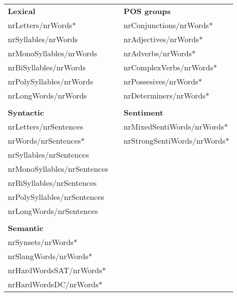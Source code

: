 \begin{tabular}{|l|l|l|} \cline{1-1}\cline{3-3}
\textbf{Lexical} & \textbf{} & \textbf{POS groups} \\ \cline{1-1}\cline{3-3}
nrLetters/nrWords* &  & nrConjunctions/nrWords* \\ \cline{1-1}\cline{3-3}
nrSyllables/nrWords &  & nrAdjectives/nrWords* \\ \cline{1-1}\cline{3-3}
nrMonoSyllables/nrWords &  & nrAdverbs/nrWords* \\ \cline{1-1}\cline{3-3}
nrBiSyllables/nrWords &  & nrComplexVerbs/nrWords* \\ \cline{1-1}\cline{3-3}
nrPolySyllables/nrWords &  & nrPossesives/nrWords* \\ \cline{1-1}\cline{3-3}
nrLongWords/nrWords &  & nrDeterminers/nrWords* \\ \cline{1-1}\cline{3-3}
\multicolumn{3}{c}{} \\ \cline{1-1}\cline{3-3}
\textbf{Syntactic} &  & \textbf{Sentiment} \\ \cline{1-1}\cline{3-3}
nrLetters/nrSentences &  & nrMixedSentiWords/nrWords* \\ \cline{1-1}\cline{3-3}
nrWords/nrSentences* &  & nrStrongSentiWords/nrWords* \\ \cline{1-1}\cline{3-3}
nrSyllables/nrSentences & \multicolumn{2}{c}{} \\ \cline{1-1}
nrMonoSyllables/nrSentences & \multicolumn{2}{c}{} \\ \cline{1-1}
nrBiSyllables/nrSentences & \multicolumn{2}{c}{} \\ \cline{1-1}
nrPolySyllables/nrSentences & \multicolumn{2}{c}{} \\ \cline{1-1}
nrLongWords/nrSentences & \multicolumn{2}{c}{} \\ \cline{1-1}
\multicolumn{3}{c}{} \\ \cline{1-1}
\textbf{Semantic} & \multicolumn{2}{c}{} \\ \cline{1-1}
nrSynsets/nrWords* & \multicolumn{2}{c}{} \\ \cline{1-1}
nrSlangWords/nrWords* & \multicolumn{2}{c}{} \\ \cline{1-1}
nrHardWordsSAT/nrWords* & \multicolumn{2}{c}{} \\ \cline{1-1}
nrHardWordsDC/nrWords* & \multicolumn{2}{c}{} \\ \cline{1-1}
\end{tabular}